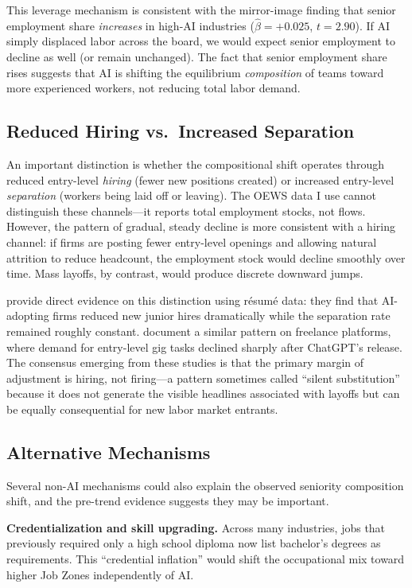 \documentclass[12pt]{article}
\begin{document}
This leverage mechanism is consistent with the mirror-image finding that senior employment share \emph{increases} in high-AI industries ($\hat{\beta} = +0.025$, $t = 2.90$). If AI simply displaced labor across the board, we would expect senior employment to decline as well (or remain unchanged). The fact that senior employment share rises suggests that AI is shifting the equilibrium \emph{composition} of teams toward more experienced workers, not reducing total labor demand.

\subsection{Reduced Hiring vs.\ Increased Separation}

An important distinction is whether the compositional shift operates through reduced entry-level \emph{hiring} (fewer new positions created) or increased entry-level \emph{separation} (workers being laid off or leaving). The OEWS data I use cannot distinguish these channels---it reports total employment stocks, not flows. However, the pattern of gradual, steady decline is more consistent with a hiring channel: if firms are posting fewer entry-level openings and allowing natural attrition to reduce headcount, the employment stock would decline smoothly over time. Mass layoffs, by contrast, would produce discrete downward jumps.

\citet{hosseini2025} provide direct evidence on this distinction using r\'{e}sum\'{e} data: they find that AI-adopting firms reduced new junior hires dramatically while the separation rate remained roughly constant. \citet{hui2024} document a similar pattern on freelance platforms, where demand for entry-level gig tasks declined sharply after ChatGPT's release. The consensus emerging from these studies is that the primary margin of adjustment is hiring, not firing---a pattern sometimes called ``silent substitution'' because it does not generate the visible headlines associated with layoffs but can be equally consequential for new labor market entrants.

\subsection{Alternative Mechanisms}

Several non-AI mechanisms could also explain the observed seniority composition shift, and the pre-trend evidence suggests they may be important.

\textbf{Credentialization and skill upgrading.} Across many industries, jobs that previously required only a high school diploma now list bachelor's degrees as requirements. This ``credential inflation'' would shift the occupational mix toward higher Job Zones independently of AI.
\end{document}
